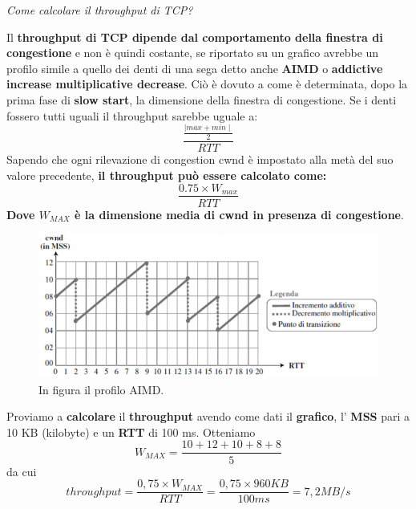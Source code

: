 \documentclass[11pt,a4paper]{article}
\theoremstyle{definition}
\begin{document}
\newpage
\begin{flushleft}
	\textit{Come calcolare il throughput di TCP?}
\end{flushleft}
Il \textbf{throughput di TCP dipende dal comportamento della finestra di congestione} e non è quindi costante, se riportato su un grafico avrebbe un profilo simile a quello dei denti di una sega detto anche \textbf{AIMD} o \textbf{addictive increase multiplicative decrease}. Ciò è dovuto a come è determinata, dopo la prima fase di \textbf{slow start}, la dimensione della finestra di congestione. Se i denti fossero tutti uguali il throughput sarebbe uguale a:\[\frac{\frac{\mid max + min \mid }{2}}{RTT}\]
Sapendo che ogni rilevazione di congestion cwnd è impostato alla metà del suo valore precedente, \textbf{il throughput può essere calcolato come:}
\[\frac{ 0.75 \times W_{max}}{RTT}\]
\textbf{Dove $W_{MAX}$ è la dimensione media di cwnd in presenza di congestione}.
\begin{figure}[!h]
	\includegraphics[scale=0.6]{Immagini/Cwnd_ex.png}
	\centering
	\caption{In figura il profilo AIMD.}
\end{figure}\newline
Proviamo a \textbf{calcolare} il \textbf{throughput} avendo come dati il \textbf{grafico}, l' \textbf{MSS} pari a 10 KB (kilobyte) e un \textbf{RTT} di 100 ms. Otteniamo
\[W_{MAX} = \frac{10 + 12 + 10 + 8 + 8}{5}\]
da cui
\[throughput =  \frac{0,75 \times W_{MAX}}{RTT}  = \frac{0,75 \times 960 KB}{100 ms} = 7,2 MB/s\]
\newpage
\end{document}
